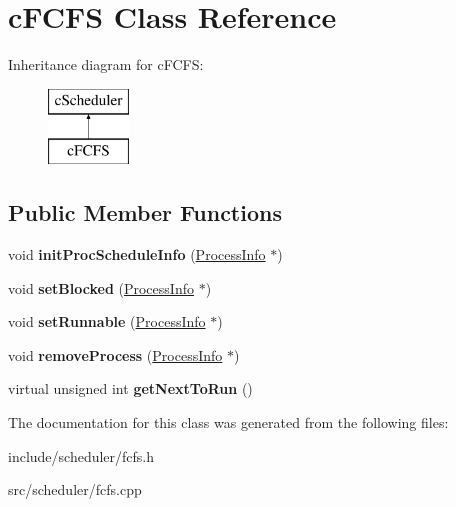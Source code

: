 \hypertarget{classcFCFS}{\section{c\-F\-C\-F\-S \-Class \-Reference}
\label{d6/dc3/classcFCFS}
}
\-Inheritance diagram for c\-F\-C\-F\-S\-:\begin{figure}[H]
\begin{center}
\leavevmode
\includegraphics[height=2.000000cm]{d6/dc3/classcFCFS}
\end{center}
\end{figure}
\subsection*{\-Public \-Member \-Functions}
\begin{DoxyCompactItemize}
\item 
\hypertarget{classcFCFS_aff34f18c6f4c3f38029d904cd2ec55de}{void {\bfseries init\-Proc\-Schedule\-Info} (\hyperlink{structProcessInfo}{\-Process\-Info} $\ast$)}\label{d6/dc3/classcFCFS_aff34f18c6f4c3f38029d904cd2ec55de}

\item 
\hypertarget{classcFCFS_a1b8ee3a759a31032ec7c1cd7b15ed5df}{void {\bfseries set\-Blocked} (\hyperlink{structProcessInfo}{\-Process\-Info} $\ast$)}\label{d6/dc3/classcFCFS_a1b8ee3a759a31032ec7c1cd7b15ed5df}

\item 
\hypertarget{classcFCFS_ab0c26f757ad8dda985d4f0295f05c781}{void {\bfseries set\-Runnable} (\hyperlink{structProcessInfo}{\-Process\-Info} $\ast$)}\label{d6/dc3/classcFCFS_ab0c26f757ad8dda985d4f0295f05c781}

\item 
\hypertarget{classcFCFS_aeeac757885108ae510b728600ebba248}{void {\bfseries remove\-Process} (\hyperlink{structProcessInfo}{\-Process\-Info} $\ast$)}\label{d6/dc3/classcFCFS_aeeac757885108ae510b728600ebba248}

\item 
\hypertarget{classcFCFS_a3e8a539b117b0eebc991e49dba9638ca}{virtual unsigned int {\bfseries get\-Next\-To\-Run} ()}\label{d6/dc3/classcFCFS_a3e8a539b117b0eebc991e49dba9638ca}

\end{DoxyCompactItemize}


\-The documentation for this class was generated from the following files\-:\begin{DoxyCompactItemize}
\item 
include/scheduler/fcfs.\-h\item 
src/scheduler/fcfs.\-cpp\end{DoxyCompactItemize}

